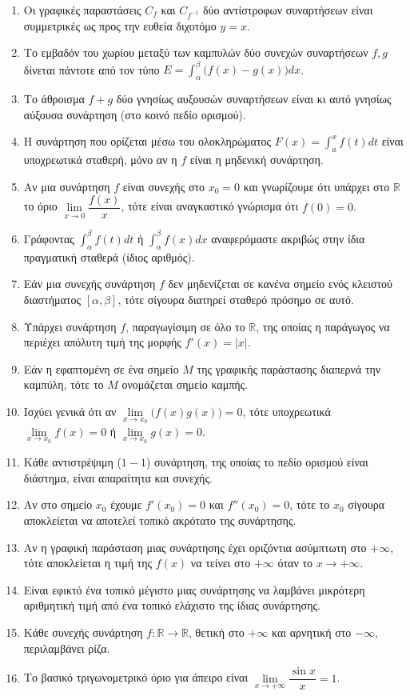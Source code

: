 \documentclass[a4paper,11pt,twoside]{article}
\begin{document}
\begin{enumerate}[label=\textbf{\arabic*.}]
    \item Οι γραφικές παραστάσεις $C_f$ και $C_{f^{-1}}$ δύο αντίστροφων συναρτήσεων είναι συμμετρικές ως προς την ευθεία διχοτόμο $y=x$.
    \item Το εμβαδόν του χωρίου μεταξύ των καμπυλών δύο συνεχών συναρτήσεων $f, g$ δίνεται πάντοτε από τον τύπο $E = \int_\alpha^\beta \big(f(x) - g(x)\big) dx$.
    \item Το άθροισμα $f+g$ δύο γνησίως αυξουσών συναρτήσεων είναι κι αυτό γνησίως αύξουσα συνάρτηση (στο κοινό πεδίο ορισμού).
    \item Η συνάρτηση που ορίζεται μέσω του ολοκληρώματος $F(x) = \int_a^x f(t)dt$ είναι υποχρεωτικά σταθερή, μόνο αν η $f$ είναι η μηδενική συνάρτηση.
    \item Αν μια συνάρτηση $f$ είναι συνεχής στο $x_0=0$ και γνωρίζουμε ότι υπάρχει στο $\mathbb{R}$ το όριο $\lim\limits_{x \to 0} \dfrac{f(x)}{x}$, τότε είναι αναγκαστικό γνώρισμα ότι $f(0)=0$.
    \item Γράφοντας $\int_\alpha^\beta f(t) dt$ ή $\int_\alpha^\beta f(x) dx$ αναφερόμαστε ακριβώς στην ίδια πραγματική σταθερά (ίδιος αριθμός).
    \item Εάν μια συνεχής συνάρτηση $f$ δεν μηδενίζεται σε κανένα σημείο ενός κλειστού διαστήματος $[\alpha, \beta]$, τότε σίγουρα διατηρεί σταθερό πρόσημο σε αυτό.
    \item Υπάρχει συνάρτηση $f$, παραγωγίσιμη σε όλο το $\mathbb{R}$, της οποίας η παράγωγος να περιέχει απόλυτη τιμή της μορφής $f'(x) = |x|$.
    \item Εάν η εφαπτομένη σε ένα σημείο $M$ της γραφικής παράστασης διαπερνά την καμπύλη, τότε το $M$ ονομάζεται σημείο καμπής.
    \item Ισχύει γενικά ότι αν $\lim\limits_{x \to x_0} \big(f(x)g(x)\big) = 0$, τότε υποχρεωτικά $\lim\limits_{x \to x_0} f(x) = 0$ ή $\lim\limits_{x \to x_0} g(x) = 0$.
    \item Κάθε αντιστρέψιμη ($1-1$) συνάρτηση, της οποίας το πεδίο ορισμού είναι διάστημα, είναι απαραίτητα και συνεχής.
    \item Αν στο σημείο $x_0$ έχουμε $f'(x_0) = 0$ και $f''(x_0) = 0$, τότε το $x_0$ σίγουρα αποκλείεται να αποτελεί τοπικό ακρότατο της συνάρτησης.
    \item Αν η γραφική παράσταση μιας συνάρτησης έχει οριζόντια ασύμπτωτη στο $+\infty$, τότε αποκλείεται η τιμή της $f(x)$ να τείνει στο $+\infty$ όταν το $x \to +\infty$.
    \item Είναι εφικτό ένα τοπικό μέγιστο μιας συνάρτησης να λαμβάνει μικρότερη αριθμητική τιμή από ένα τοπικό ελάχιστο της ίδιας συνάρτησης.
    \item Κάθε συνεχής συνάρτηση $f: \mathbb{R} \to \mathbb{R}$, θετική στο $+\infty$ και αρνητική στο $-\infty$, περιλαμβάνει ρίζα.
    \item Το βασικό τριγωνομετρικό όριο για άπειρο είναι $\lim\limits_{x \to +\infty} \dfrac{\sin x}{x} = 1$.
\end{enumerate}
\end{document}
